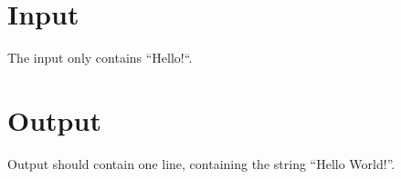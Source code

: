 
\section*{Input}

The input only contains ``Hello!``.

\section*{Output}

Output should contain one line, containing the string ``Hello World!''.
